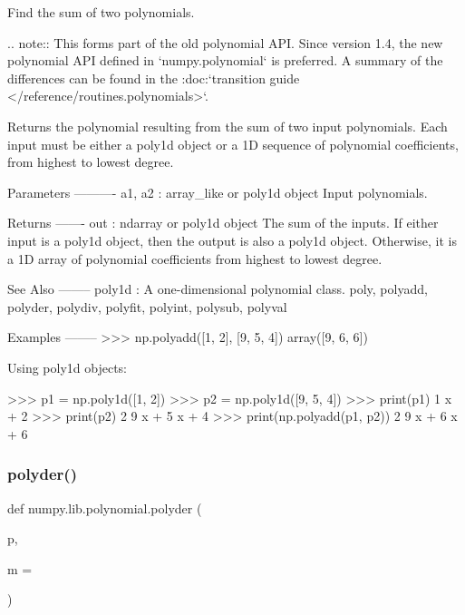 \begin{DoxyVerb}Find the sum of two polynomials.

.. note::
   This forms part of the old polynomial API. Since version 1.4, the
   new polynomial API defined in `numpy.polynomial` is preferred.
   A summary of the differences can be found in the
   :doc:`transition guide </reference/routines.polynomials>`.

Returns the polynomial resulting from the sum of two input polynomials.
Each input must be either a poly1d object or a 1D sequence of polynomial
coefficients, from highest to lowest degree.

Parameters
----------
a1, a2 : array_like or poly1d object
    Input polynomials.

Returns
-------
out : ndarray or poly1d object
    The sum of the inputs. If either input is a poly1d object, then the
    output is also a poly1d object. Otherwise, it is a 1D array of
    polynomial coefficients from highest to lowest degree.

See Also
--------
poly1d : A one-dimensional polynomial class.
poly, polyadd, polyder, polydiv, polyfit, polyint, polysub, polyval

Examples
--------
>>> np.polyadd([1, 2], [9, 5, 4])
array([9, 6, 6])

Using poly1d objects:

>>> p1 = np.poly1d([1, 2])
>>> p2 = np.poly1d([9, 5, 4])
>>> print(p1)
1 x + 2
>>> print(p2)
   2
9 x + 5 x + 4
>>> print(np.polyadd(p1, p2))
   2
9 x + 6 x + 6\end{DoxyVerb}
 \mbox{\label{namespacenumpy_1_1lib_1_1polynomial_a65e87b3b7f328385344947a14ea36453}} 
\subsubsection{\texorpdfstring{polyder()}{polyder()}}
{\footnotesize\ttfamily def numpy.\+lib.\+polynomial.\+polyder (\begin{DoxyParamCaption}\item[{}]{p,  }\item[{}]{m = {} }\end{DoxyParamCaption})}

